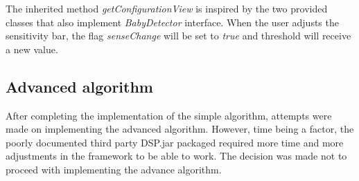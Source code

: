 

The inherited method \emph{getConfigurationView} is inspired by the two provided
classes that also implement \emph{BabyDetector} interface. When the user adjusts
the sensitivity bar, the flag \emph{senseChange} will be set to \emph{true} and
threshold will receive a new value.

\subsection{Advanced algorithm}
After completing the implementation of the simple algorithm, attempts were made
on implementing the advanced algorithm. However, time being a factor, the poorly
documented third party DSP.jar packaged required more time and more adjustments
in the framework to be able to work. The decision was made not to proceed with
implementing the advance algorithm.
